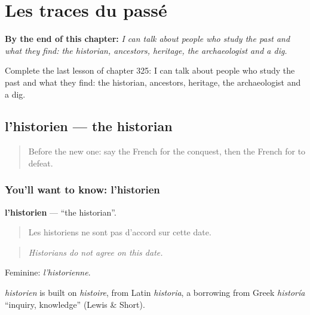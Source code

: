 
\chapter{Les traces du passé}
\label{ch:fr-les-traces-du-passe}

\begin{chapteropening}
\textbf{By the end of this chapter:} \emph{I can talk about people who study the past and what they find: the historian, ancestors, heritage, the archaeologist and a dig.}

Complete the last lesson of chapter 325: I can talk about people who study the past and what they find: the historian, ancestors, heritage, the archaeologist and a dig.
\end{chapteropening}

\section[l'historien]{l'historien — the historian}

\label{lesson:FR-C325-historien}



\begin{quote}
Before the new one: say the French for the conquest, then the French for to defeat.
\end{quote}

\subsection*{You'll want to know: l'historien}
\textbf{l'historien} — \textquotedblleft{}the historian\textquotedblright{}.

\begin{quote}
Les historiens ne sont pas d'accord sur cette date.
\end{quote}

\begin{quote}
\emph{Historians do not agree on this date.}
\end{quote}

Feminine: \emph{l'historienne}.

\begin{cousinweb}
\emph{historien} is built on \emph{histoire}, from Latin \emph{historia}, a borrowing from Greek \emph{historía} \textquotedblleft{}inquiry, knowledge\textquotedblright{} (Lewis \& Short).
\end{cousinweb}

